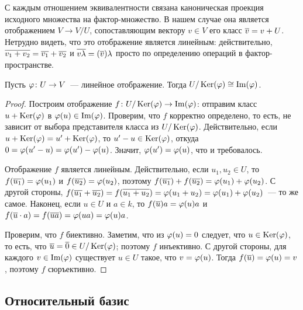 С каждым отношением эквивалентности связана каноническая проекция
исходного множества на фактор-множество. В нашем случае она является
отображением $V\to V/U$, сопоставляющим вектору $v\in V$ его класс
$\overline{v}=v+U$. Нетрудно видеть, что это отображение является линейным:
действительно, $\overline{v_1+v_2}=\overline{v_1}+\overline{v_2}$ и
$\overline{v\lambda}=(\overline{v})\lambda$ просто по определению операций в фактор-пространстве.



\begin{theorem}\label{thm_homomorphism}
Пусть $\varphi\colon U\to V$~--- линейное отображение. Тогда
$U/\operatorname{Ker}(\varphi)\cong\operatorname{Im}(\varphi)$.
\end{theorem}
\begin{proof}
Построим отображение $f\colon U/\operatorname{Ker}(\varphi)\to\operatorname{Im}(\varphi)$:
отправим класс $u+\operatorname{Ker}(\varphi)$ в $\varphi(u)\in\operatorname{Im}(\varphi)$.
Проверим, что $f$ корректно определено, то есть, не зависит от выбора
представителя класса из $U/\operatorname{Ker}(\varphi)$. Действительно, если
$u+\operatorname{Ker}(\varphi)=u'+\operatorname{Ker}(\varphi)$, то $u'-u\in\operatorname{Ker}(\varphi)$, откуда
$0=\varphi(u'-u)=\varphi(u')-\varphi(u)$. Значит, $\varphi(u')=\varphi(u)$, что и
требовалось.

Отображение $f$ является линейным. Действительно, если $u_1,u_2\in U$,
то $f(\overline{u_1})=\varphi(u_1)$ и $f(\overline{u_2})=\varphi(u_2)$, поэтому
$f(\overline{u_1})+f(\overline{u_2}) = \varphi(u_1)+\varphi(u_2)$. С другой стороны,
$f(\overline{u_1}+\overline{u_2}) = f(\overline{u_1+u_2}) = \varphi(u_1+u_2) =
\varphi(u_1)+\varphi(u_2)$~--- то же самое. Наконец, если $u\in U$ и
$a\in k$, то $f(\overline{u})a=\varphi(u)a$ и
$f(\overline{u}\cdot a) = f(\overline{u a}) = \varphi(ua) =
\varphi(u)a$.

Проверим, что $f$ биективно. Заметим, что из $\varphi(u)=0$ следует, что
$u\in\operatorname{Ker}(\varphi)$, то есть, что $\overline{u}=\overline{0}\in U/\operatorname{Ker}(\varphi)$; поэтому
$f$ инъективно. С другой стороны, для каждого $v\in\operatorname{Im}(\varphi)$
существует $u\in U$ такое, что $v=\varphi(u)$. Тогда $f(\overline{u})=\varphi(u)=v$,
поэтому $f$ сюръективно.
\end{proof}

\subsection{Относительный базис}

